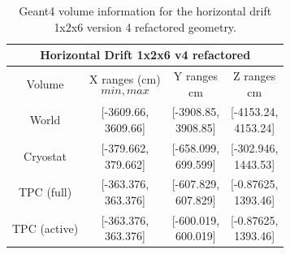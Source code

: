 \documentclass[8pt]{refart}
\begin{document}
\begin{table}[H]
    \centering
    \begin{tabular}{|c|c|c|c|}
    \hline
        \multicolumn{4}{|c|}{\textbf{Horizontal Drift 1x2x6 v4 refactored}}\\
        \hline
        Volume & \makecell{X ranges (cm)\\ \[min,max\]} & \makecell{Y ranges\\cm} & \makecell{Z ranges\\cm}\\
        \hline
        \hline
        World & \makecell{[-3609.66,\\  3609.66]} & \makecell{[-3908.85,\\  3908.85]} & \makecell{[-4153.24,\\  4153.24]}\\
        \hline
        Cryostat &\makecell{[-379.662,\\  379.662]} & \makecell{[-658.099,\\  699.599]} & \makecell{[-302.946,\\  1443.53]} \\
        \hline
        TPC (full) &\makecell{[-363.376,\\  363.376]} & \makecell{[-607.829,\\  607.829]} & \makecell{[-0.87625,\\  1393.46]} \\
        \hline
        TPC ({\color{red}active}) & \makecell{[-363.376,\\  363.376]} & \makecell{[-600.019,\\  600.019]} & \makecell{[-0.87625,\\  1393.46]} \\
        \hline
    \end{tabular}
    \caption{Geant4 volume information for the horizontal drift 1x2x6 version 4 refactored geometry.}
    \label{tab:my_label}
\end{table}
\end{document}
